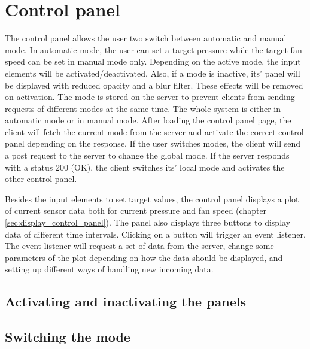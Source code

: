 
\section{Control panel}
\label{sec:control_panel}

The control panel allows the user two switch between automatic and manual mode. In automatic mode, the user can set a target pressure while the target fan speed can be set in manual mode only. Depending on the active mode, the input elements will be activated/deactivated.  Also, if a mode is inactive, its' panel will be displayed with reduced opacity and a blur filter. These effects will be removed on activation. The mode is stored on the server to prevent clients from sending requests of different modes at the same time. The whole system is either in automatic mode or in manual mode. After loading the control panel page, the client will fetch the current mode from the server and activate the correct control panel depending on the response. If the user switches modes, the client will send a post request to the server to change the global mode. If the server responds with a status 200 (OK), the client switches its' local mode and activates the other control panel.

Besides the input elements to set target values, the control panel displays a plot of current sensor data both for current pressure and fan speed (chapter \ref{sec:display_control_panel}). The panel also displays three buttons to display data of different time intervals. Clicking on a button will trigger an event listener. The event listener will request a set of data from the server, change some parameters of the plot depending on how the data should be displayed, and setting up different ways of handling new incoming data.



\subsection{Activating and inactivating the panels}
\label{subsec:activating_and_inactivating_the_panels}



\subsection{Switching the mode}
\label{subsec:switching_the_mode}



